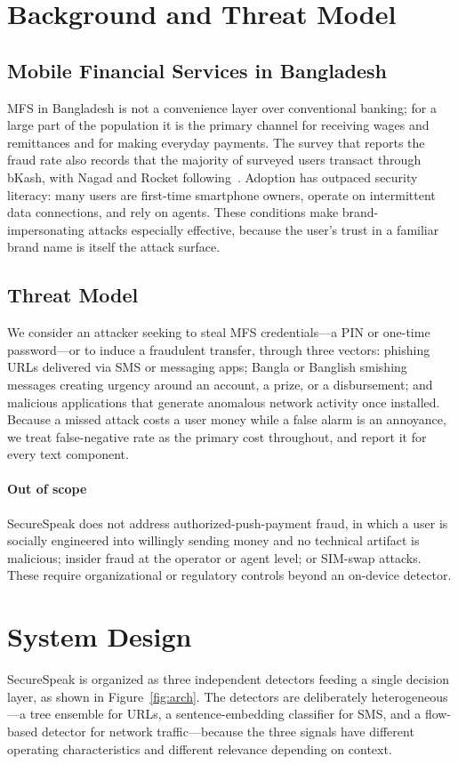\documentclass[manuscript,screen,review]{acmart}
\begin{document}
\section{Background and Threat Model}
\subsection{Mobile Financial Services in Bangladesh}
MFS in Bangladesh is not a convenience layer over conventional banking; for a large part of the population it is the primary channel for receiving wages and remittances and for making everyday payments. The survey that reports the fraud rate also records that the majority of surveyed users transact through bKash, with Nagad and Rocket following~\cite{pri2022}. Adoption has outpaced security literacy: many users are first-time smartphone owners, operate on intermittent data connections, and rely on agents. These conditions make brand-impersonating attacks especially effective, because the user's trust in a familiar brand name is itself the attack surface.

\subsection{Threat Model}
We consider an attacker seeking to steal MFS credentials---a PIN or one-time password---or to induce a fraudulent transfer, through three vectors: phishing URLs delivered via SMS or messaging apps; Bangla or Banglish smishing messages creating urgency around an account, a prize, or a disbursement; and malicious applications that generate anomalous network activity once installed. Because a missed attack costs a user money while a false alarm is an annoyance, we treat false-negative rate as the primary cost throughout, and report it for every text component.

\paragraph{Out of scope} SecureSpeak does not address authorized-push-payment fraud, in which a user is socially engineered into willingly sending money and no technical artifact is malicious; insider fraud at the operator or agent level; or SIM-swap attacks. These require organizational or regulatory controls beyond an on-device detector.

\section{System Design}
SecureSpeak is organized as three independent detectors feeding a single decision layer, as shown in Figure~\ref{fig:arch}. The detectors are deliberately heterogeneous---a tree ensemble for URLs, a sentence-embedding classifier for SMS, and a flow-based detector for network traffic---because the three signals have different operating characteristics and different relevance depending on context.
\end{document}
